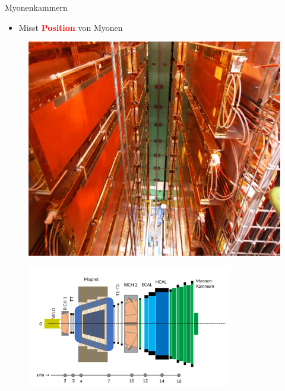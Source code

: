 \begin{frame}{Myonenkammern}
    \begin{minipage}{0.58\textwidth}
    \begin{itemize}
        \item Misst \textcolor{red}{\textbf{Position}} von Myonen
    \end{itemize}
    \end{minipage}\hfill
    \begin{minipage}{0.38\textwidth}
        \begin{figure}[h]
        \centering
        \includegraphics[height=2.5 cm]{Figures Introductory Lecture/LHCb Detector/LHCb_Muon.jpg}%
        \end{figure}
    \end{minipage}
    \vspace{-0.5cm}
    \begin{figure}[h]
    \centering
    \includegraphics[width=0.8\textwidth]{Figures Introductory Lecture/LHCb Detector/LHCb_9_DE.png}
    \end{figure}
\end{frame}

